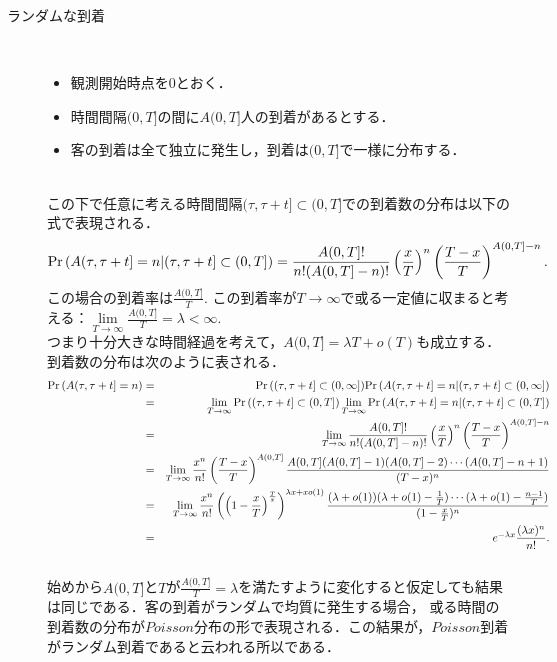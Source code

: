 \documentclass[a4j,papersize,disablejfam,slide,14pt]{jsarticle}
\def\exp#1{\mbox{$ e^{#1} $}} %
\def\prob#1{\mbox{${\rm Pr} \left( #1 \right)$}} %
\def\cprob#1#2{\mbox{${\rm Pr} \left( #1 | #2 \right)$}} %
\begin{document}
    \newpage
    \begin{description}
    	\item[ランダムな到着]\mbox{}\\
        	\begin{itemize}
    			\item 観測開始時点を$0$とおく．
        		\item 時間間隔$(0, T]$の間に$A(0, T]$人の到着があるとする．
        		\item 客の到着は全て独立に発生し，到着は$(0, T]$で一様に分布する．
            \end{itemize}
            \mbox{}\\
        	この下で任意に考える時間間隔$(\tau, \tau + t] \subset (0, T]$での到着数の分布は以下の式で表現される．
        	\begin{eqnarray}
        		\cprob{A(\tau, \tau + t] = n}{(\tau, \tau + t] \subset (0, T]} = \frac{A(0, T]!}{n!(A(0, T]-n)!} \left( \frac{x}{T} \right)^n \left( \frac{T-x}{T} \right)^{A(0, T]-n}.
        	\end{eqnarray}
        	この場合の到着率は$\frac{A(0, T]}{T}$.
        	この到着率が$T \to \infty$で或る一定値に収まると考える：$\lim\limits_{T \to \infty} \frac{A(0, T]}{T} = \lambda < \infty.$ \\
        	つまり十分大きな時間経過を考えて，$A(0, T] = \lambda T + o(T)$も成立する．到着数の分布は次のように表される．
        	\begin{eqnarray}
        		\prob{A(\tau, \tau + t] = n} &=& \prob{(\tau, \tau + t] \subset (0, \infty]} \cprob{A(\tau, \tau + t] = n}{(\tau, \tau + t] \subset (0, \infty]} \\
                &=& \lim_{T \to \infty} \prob{(\tau, \tau + t] \subset (0, T]} \lim_{T \to \infty} \cprob{A(\tau, \tau + t] = n}{(\tau, \tau + t] \subset (0, T]} \\
                &=& \lim_{T \to \infty} \frac{A(0, T]!}{n!(A(0, T]-n)!} \left( \frac{x}{T} \right)^n \left( \frac{T-x}{T} \right)^{A(0, T]-n} \\
            	&=& \lim_{T \to \infty} \frac{x^n}{n!} \left(\frac{T-x}{T}\right)^{A(0, T]} \frac{A(0, T](A(0, T]-1)(A(0, T]-2)\cdots(A(0, T]-n+1)}{(T-x)^n} \\
            	&=& \lim_{T \to \infty} \frac{x^n}{n!} \left(\left(1 - \frac{x}{T}\right)^{\frac{T}{x}}\right)^{\lambda x + x o(1)}
            		\frac{(\lambda + o(1))(\lambda + o(1)-\frac{1}{T})\cdots(\lambda + o(1)-\frac{n-1}{T})}{(1-\frac{x}{T})^n} \\
            	&=& \exp{-\lambda x} \frac{(\lambda x)^n}{n!}.
        	\end{eqnarray}
            \mbox{}\\
            始めから$A(0, T]$と$T$が$\frac{A(0, T]}{T} = \lambda$を満たすように変化すると仮定しても結果は同じである．客の到着がランダムで均質に発生する場合，
            或る時間の到着数の分布が$Poisson$分布の形で表現される．この結果が，$Poisson$到着がランダム到着であると云われる所以である．
    \end{description}
    
\end{document}
